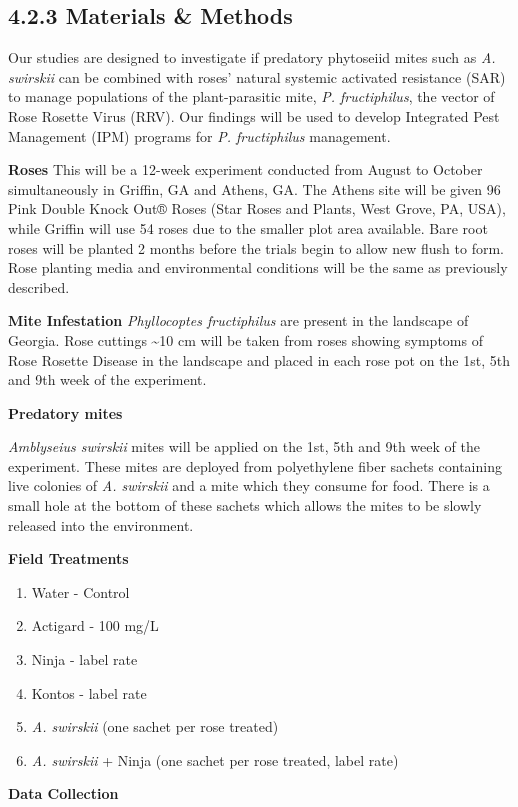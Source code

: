 \documentclass[12pt,final,CPage]{ufthesis}
\begin{document}
{  \hypertarget{materials-methods}{%
  \subsection{4.2.3 Materials \& Methods}\label{materials-methods}}

  Our studies are designed to investigate if predatory phytoseiid mites such as \emph{A. swirskii} can be combined with roses' natural systemic activated resistance (SAR) to manage populations of the plant-parasitic mite, \emph{P. fructiphilus}, the vector of Rose Rosette Virus (RRV). Our findings will be used to develop Integrated Pest Management (IPM) programs for \emph{P. fructiphilus} management.

  \textbf{Roses}
  This will be a 12-week experiment conducted from August to October simultaneously in Griffin, GA and Athens, GA.
  The Athens site will be given 96 Pink Double Knock Out® Roses (Star Roses and Plants, West Grove, PA, USA), while Griffin will use 54 roses due to the smaller plot area available. Bare root roses will be planted 2 months before the trials begin to allow new flush to form. Rose planting media and environmental conditions will be the same as previously described.

  \textbf{Mite Infestation}
  \emph{Phyllocoptes fructiphilus} are present in the landscape of Georgia. Rose cuttings \textasciitilde10 cm will be taken from roses showing symptoms of Rose Rosette Disease in the landscape and placed in each rose pot on the 1st, 5th and 9th week of the experiment.

  \textbf{Predatory mites}

  \emph{Amblyseius swirskii} mites will be applied on the 1st, 5th and 9th week of the experiment. These mites are deployed from polyethylene fiber sachets containing live colonies of \emph{A. swirskii} and a mite which they consume for food. There is a small hole at the bottom of these sachets which allows the mites to be slowly released into the environment.

  \textbf{Field Treatments}
  \begin{enumerate}
  \def\labelenumi{\arabic{enumi}.}
  \tightlist
  \item
    Water - Control
  \item
    Actigard - 100 mg/L
  \item
    Ninja - label rate
  \item
    Kontos - label rate
  \item
    \emph{A. swirskii} (one sachet per rose treated)
  \item
    \emph{A. swirskii} + Ninja (one sachet per rose treated, label rate)
  \end{enumerate}
  \textbf{Data Collection}

}
\end{document}
